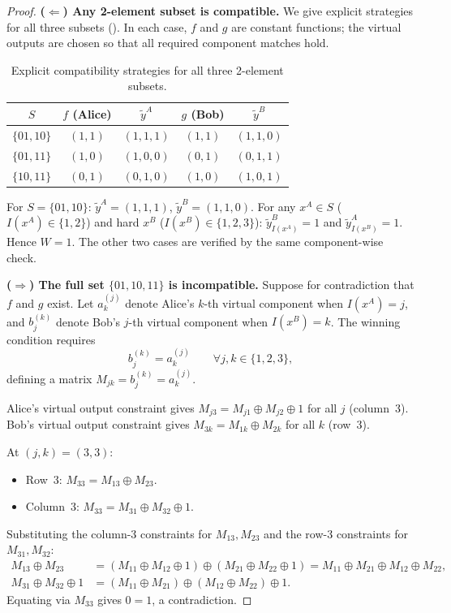 \documentclass[11pt,letterpaper]{article}
\newcommand{\ytildeA}{\tilde{y}^{A}}
\newcommand{\ytildeB}{\tilde{y}^{B}}
\newcommand{\xor}{\oplus}
\begin{document}
\begin{proof}
\textbf{($\Longleftarrow$) Any 2-element subset is compatible.}
We give explicit strategies for all three subsets (). In each case, $f$ and $g$ are constant functions; the virtual outputs are chosen so that all required component matches hold.

\begin{table}[ht]
\centering
\caption{Explicit compatibility strategies for all three 2-element subsets.}
\label{tab:strategies}
\begin{tabular}{ccccc}
\toprule
$S$ & $f$ (Alice) & $\ytildeA$ & $g$ (Bob) & $\ytildeB$ \\
\midrule
$\{01,10\}$ & $(1,1)$ & $(1,1,1)$ & $(1,1)$ & $(1,1,0)$ \\
$\{01,11\}$ & $(1,0)$ & $(1,0,0)$ & $(0,1)$ & $(0,1,1)$ \\
$\{10,11\}$ & $(0,1)$ & $(0,1,0)$ & $(1,0)$ & $(1,0,1)$ \\
\bottomrule
\end{tabular}
\end{table}

For $S = \{01,10\}$: $\ytildeA = (1,1,1)$, $\ytildeB = (1,1,0)$. For any $x^A \in S$ ($I(x^A) \in \{1,2\}$) and hard $x^B$ ($I(x^B) \in \{1,2,3\}$): $\ytildeB_{I(x^A)} = 1$ and $\ytildeA_{I(x^B)} = 1$. Hence $W=1$. The other two cases are verified by the same component-wise check.

\textbf{($\Longrightarrow$) The full set $\{01,10,11\}$ is incompatible.}
Suppose for contradiction that $f$ and $g$ exist. Let $a_k^{(j)}$ denote Alice's $k$-th virtual component when $I(x^A)=j$, and $b_j^{(k)}$ denote Bob's $j$-th virtual component when $I(x^B)=k$. The winning condition requires
\[
  b_j^{(k)} = a_k^{(j)} \qquad \forall j,k \in \{1,2,3\},
\]
defining a matrix $M_{jk} = b_j^{(k)} = a_k^{(j)}$.

Alice's virtual output constraint gives $M_{j3} = M_{j1} \xor M_{j2} \xor 1$ for all $j$ (column~3).
Bob's virtual output constraint gives $M_{3k} = M_{1k} \xor M_{2k}$ for all $k$ (row~3).

At $(j,k)=(3,3)$:
\begin{itemize}[leftmargin=*,itemsep=1pt]
  \item Row~3: $M_{33} = M_{13} \xor M_{23}$.
  \item Column~3: $M_{33} = M_{31} \xor M_{32} \xor 1$.
\end{itemize}
Substituting the column-3 constraints for $M_{13}, M_{23}$ and the row-3 constraints for $M_{31}, M_{32}$:
\begin{align*}
  M_{13} \xor M_{23} &= (M_{11} \xor M_{12} \xor 1) \xor (M_{21} \xor M_{22} \xor 1) = M_{11} \xor M_{21} \xor M_{12} \xor M_{22}, \\
  M_{31} \xor M_{32} \xor 1 &= (M_{11} \xor M_{21}) \xor (M_{12} \xor M_{22}) \xor 1.
\end{align*}
Equating via $M_{33}$ gives $0 = 1$, a contradiction.
\end{proof}
\end{document}
